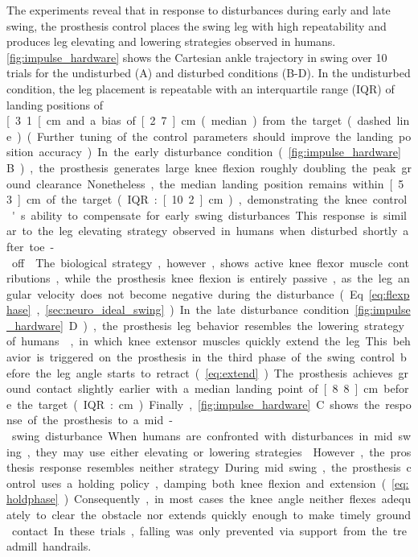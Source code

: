 The experiments reveal that in response to disturbances during early and late
swing, the prosthesis control places the swing leg with high repeatability and
produces leg elevating and lowering strategies observed in humans.
\cref{fig:impulse_hardware} shows the Cartesian ankle trajectory in swing over
10 trials for the undisturbed (A) and disturbed conditions (B-D). In the
undisturbed condition, the leg placement is repeatable with an interquartile
range (IQR) of landing positions of \unit[3.1[{cm} and a bias of \unit[2.7]{cm}
(median) from the target (dashed line).  (Further tuning of the control
parameters should improve the landing position accuracy.)

In the early disturbance condition (\cref{fig:impulse_hardware}B), the
prosthesis generates large knee flexion roughly doubling the peak ground
clearance. Nonetheless, the median landing position remains within
\unit[5.3]{cm} of the target (IQR: \unit[10.2]{cm}), demonstrating the knee
control's ability to compensate for early swing disturbances. This response is
similar to the leg elevating strategy observed in humans when disturbed shortly
after toe-off \citep{eng1994strategies, schillings2000muscular}. The biological
strategy, however, shows active knee flexor muscle contributions, while the
prosthesis knee flexion is entirely passive, as the leg angular velocity does
not become negative during the disturbance (Eq.~\ref{eq:flexphase},
\cref{sec:neuro_ideal_swing}).

In the late disturbance condition \cref{fig:impulse_hardware}D),
the prosthesis leg behavior resembles the lowering strategy of
humans~\citep{schillings2000muscular}, in which knee extensor muscles quickly
extend the leg. This behavior is triggered on the prosthesis in the third phase
of the swing control before the leg angle starts to retract
(\cref{eq:extend}). The prosthesis achieves ground contact slightly earlier
with a median landing point of \unit[8.8]{cm} before the target (IQR:
\unit[3]{cm}).

Finally, \cref{fig:impulse_hardware}C shows the response of the
prosthesis to a mid-swing disturbance. When humans are confronted with
disturbances in mid swing, they may use either elevating or lowering strategies
\citep{eng1994strategies, schillings2000muscular}. However, the prosthesis
response resembles neither strategy. During mid swing, the prosthesis control
uses a holding policy, damping both knee flexion and extension
(\cref{eq:holdphase}). Consequently, in most cases the knee angle neither
flexes adequately to clear the obstacle nor extends quickly enough to make
timely ground contact. In these trials, falling was only prevented via support
from the treadmill handrails.

